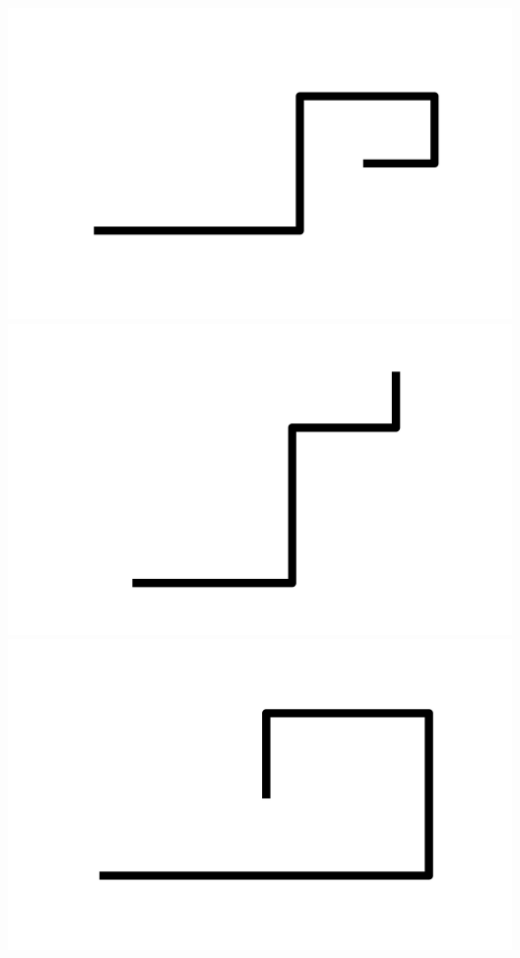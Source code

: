 \documentclass[]{report}
\begin{document}
\includegraphics[scale=.1]{pictures/21/state_cluster_shapes_166.pdf} 
\includegraphics[scale=.1]{pictures/21/state_cluster_shapes_167.pdf} 
\includegraphics[scale=.1]{pictures/21/state_cluster_shapes_168.pdf} 
\end{document}
